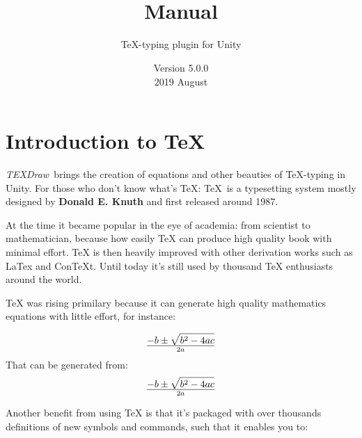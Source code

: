 \documentclass[12pt]{article}
\title{\TEXDraw\\ Manual}
\subtitle{\TeX-typing plugin for Unity}
\date{Version 5.0.0\\2019 August}
\newenvironment{code}{\verbatim}{\endverbatim}
\def\TEXDraw{\textit{TEXDraw}}
\begin{document}
	\maketitle
	\section{Introduction to \TeX}
	
	\TEXDraw\ brings the creation of equations and other beauties of \TeX-typing in Unity. For those who don't know what's \TeX: \TeX\ is a typesetting system mostly designed by \textbf{Donald E. Knuth} and first released around 1987. 
	
	At the time it became popular in the eye of academia: from scientist to mathematician, because how easily TeX can produce high quality book with minimal effort. TeX is then heavily improved with other derivation works such as LaTex and ConTeXt. Until today it's still used by thousand TeX enthusiasts around the world. 
	
	TeX was rising primilary because it can generate high quality mathematics equations with little effort, for instance:
	
	$$-b \pm \sqrt{b^2 - 4ac} \over 2a$$
	That can be generated from:
		\begin{code}
	$$-b \pm \sqrt{b^2 - 4ac} \over 2a$$	
		\end{code}

	Another benefit from using TeX is that it's packaged with over thousands definitions of new symbols and commands, such that it enables you to:
	
\end{document}
